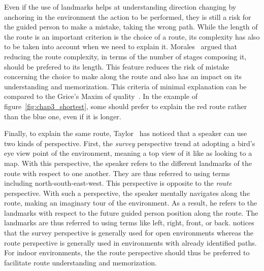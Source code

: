 Even if the use of landmarks helps at understanding direction changing by anchoring in the environment the action to be performed, they is still a risk for the guided person to make a mistake, taking the wrong path. While the length of the route is an important criterion is the choice of a route, its complexity has also to be taken into account when we need to explain it. Morales~\cite{morales_2015_building} argued that reducing the route complexity, in terms of the number of stages composing it, should be prefered to its length. This feature reduces the risk of mistake concerning the choice to make along the route and also has an impact on its understanding and memorization. This criteria of minimal explanation can be compared to the Grice's Maxim of quality~\cite{grice_1975_logic}. In the example of figure~\ref{fig:chap3_shortest}, some should prefer to explain the red route rather than the blue one, even if it is longer.

Finally, to explain the same route, Taylor~\cite{taylor_1992_spatial} has noticed that a speaker can use two kinds of perspective. First, the \textit{survey} perspective trend at adopting a bird's eye view point of the environment, meaning a top view of it like as looking to a map. With this perspective, the speaker refers to the different landmarks of the route with respect to one another. They are thus referred to using terms including north-south-east-west. This perspective is opposite to the \textit{route} perspective. With such a perspective, the speaker mentally navigates along the route, making an imaginary tour of the environment. As a result, he refers to the landmarks with respect to the future guided person position along the route. The landmarks are thus referred to using terms like left, right, front, or back. \cite{taylor_1996_perspective} notices that the survey perspective is generally used for open environments whereas the route perspective is generally used in environments with already identified paths. For indoor environments, the the route perspective should thus be preferred to facilitate route understanding and memorization.



